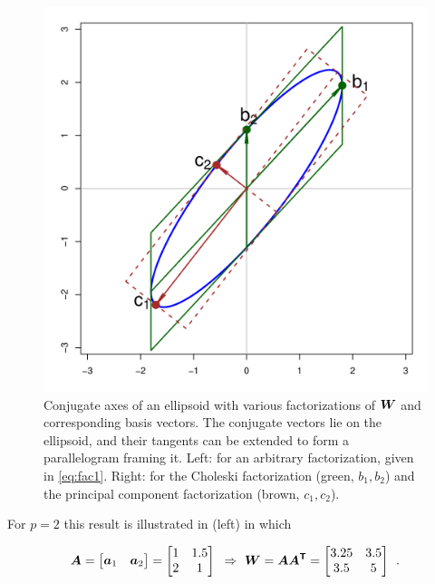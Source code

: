 \begin{figure}[htb]
\begin{minipage}[b]{.49\linewidth}
  \includegraphics[width=1\linewidth]{fig/conjugate2}
 \end{minipage}
\caption{Conjugate axes of an ellipsoid with various factorizations of $\bm{W}$ and corresponding
basis vectors.
The conjugate vectors lie on the ellipsoid, and their tangents can be extended to form a parallelogram framing it.
Left: for an arbitrary factorization, given in \eqref{eq:fac1}.
Right: for the Choleski factorization (green, $b_1, b_2$) and the principal component factorization (brown, $c_1, c_2$).
}
\label{fig:conjugate}
\end{figure}
For
$p=2$
this result is illustrated in  (left)
in which

\begin{equation}\label{eq:fac1}
\bm{A}=\left[ \begin{matrix}
   \bm{a}_{1} & \bm{a}_{2}  \\
\end{matrix} \right]=\left[
\begin{matrix}
   1 & 1.5  \\
   2 & 1  \\
\end{matrix} \right]
\mbox{   }\Rightarrow\mbox{   }
\bm{W}=\bm{A A^\mathsf{T}}=
\left[ \begin{matrix}
   3.25 & 3.5  \\
   3.5 & 5  \\
\end{matrix} \right]
\:\: .
\end{equation}

